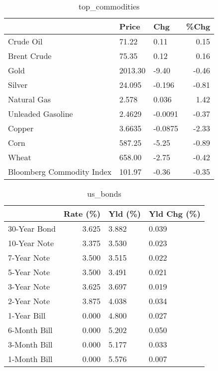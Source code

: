 \documentclass{article}%
\begin{document}
\begin{table}[htbp]%
\caption{top\_commodities}%
\centering%
\begin{adjustbox}{width=1\textwidth}%
\begin{tabular}{lllr}
\toprule
                          &   Price &     Chg &  \%Chg \\
\midrule
               Crude Oil  &   71.22 &    0.11 &  0.15 \\
             Brent Crude  &   75.35 &    0.12 &  0.16 \\
                    Gold  & 2013.30 &   -9.40 & -0.46 \\
                  Silver  &  24.095 &  -0.196 & -0.81 \\
             Natural Gas  &   2.578 &   0.036 &  1.42 \\
       Unleaded Gasoline  &  2.4629 & -0.0091 & -0.37 \\
                  Copper  &  3.6635 & -0.0875 & -2.33 \\
                    Corn  &  587.25 &   -5.25 & -0.89 \\
                   Wheat  &  658.00 &   -2.75 & -0.42 \\
Bloomberg Commodity Index &  101.97 &   -0.36 & -0.35 \\
\bottomrule
\end{tabular}
%
\end{adjustbox}%
\end{table}

%


\begin{table}[htbp]%
\caption{us\_bonds}%
\centering%
\begin{adjustbox}{width=1\textwidth}%
\begin{tabular}{lrll}
\toprule
             &  Rate (\%) & Yld (\%) & Yld Chg (\%) \\
\midrule
30-Year Bond &     3.625 &   3.882 &       0.039 \\
10-Year Note &     3.375 &   3.530 &       0.023 \\
 7-Year Note &     3.500 &   3.515 &       0.022 \\
 5-Year Note &     3.500 &   3.491 &       0.021 \\
 3-Year Note &     3.625 &   3.697 &       0.019 \\
 2-Year Note &     3.875 &   4.038 &       0.034 \\
 1-Year Bill &     0.000 &   4.800 &       0.027 \\
6-Month Bill &     0.000 &   5.202 &       0.050 \\
3-Month Bill &     0.000 &   5.177 &       0.033 \\
1-Month Bill &     0.000 &   5.576 &       0.007 \\
\bottomrule
\end{tabular}
%
\end{adjustbox}%
\end{table}
\end{document}
